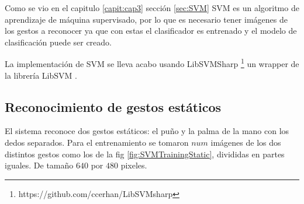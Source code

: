 Como se vio en el capitulo \ref{capit:cap3} sección \ref{sec:SVM} SVM es un algoritmo de aprendizaje de máquina supervisado, por lo que es necesario tener imágenes de los gestos a reconocer ya que con estas el clasificador es entrenado y el modelo de clasificación puede ser creado. 

La implementación de SVM se lleva acabo usando LibSVMSharp \footnote{https://github.com/ccerhan/LibSVMsharp} un wrapper de la librería LibSVM \citep{Chang2011}.

\subsection{Reconocimiento de gestos estáticos}\label{RecognitionEstatic}

El sistema reconoce dos gestos estáticos: el puño y la palma de la mano con los dedos separados.  Para el entrenamiento se tomaron $num$ imágenes de los dos distintos gestos como los de la fig \ref{fig:SVMTrainingStatic}, divididas en partes iguales. De tamaño $640$ por $480$ pixeles.   

